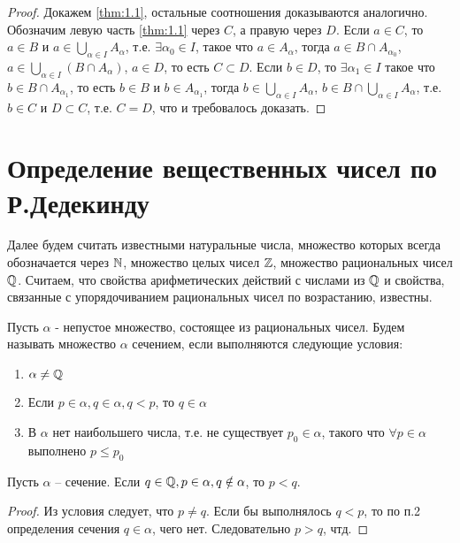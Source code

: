 \documentclass[main]{subfiles}
\begin{document}
\begin{proof}
    Докажем \eqref{thm:1.1}, остальные соотношения доказываются аналогично.
    Обозначим левую часть \eqref{thm:1.1} через $C$, а правую через $D$.
    Если $a \in C$, то $a\in B$ и $a \in \bigcup_{\alpha \in I} A_\alpha$,
    т.е. $\exists \alpha_0 \in I$, такое что $a \in A_\alpha$, тогда
    $a \in B \cap A_{\alpha_0}$, $a \in \bigcup_{\alpha \in I}(B \cap A_\alpha)$,
    $a \in D$, то есть $C \subset D$. Если $b \in D$, то $\exists \alpha_1 \in I$
    такое что $b \in B \cap A_{\alpha_1}$, то есть $b \in B$ и $b \in A_{\alpha_1}$,
    тогда $b \in \bigcup_{\alpha \in I} A_\alpha$,
    $b \in B \cap \bigcup_{\alpha \in I} A_\alpha$, т.е. $b \in C$ и $D \subset C$,
    т.е. $C = D$, что и требовалось доказать.
\end{proof}

\section{Определение вещественных чисел по Р.Дедекинду}
Далее будем считать известными натуральные числа, множество которых всегда
обозначается через $\mathbb{N}$, множество целых чисел $\mathbb{Z}$, множество
рациональных чисел $\mathbb{Q}$. Считаем, что свойства арифметических действий
с числами из $\mathbb{Q}$ и свойства, связанные с упорядочиванием рациональных
чисел по возрастанию, известны.

\begin{definition}
    Пусть $\alpha$ - непустое множество, состоящее из рациональных чисел. Будем
    называть множество $\alpha$ сечением, если выполняются следующие условия:
    \begin{enumerate}
        \item $\alpha \neq \mathbb{Q}$
        \item Если $p \in \alpha, q \in \alpha, q < p$, то $q \in \alpha$
        \item В $\alpha$ нет наибольшего числа, т.е. не существует $p_0 \in \alpha$,
              такого что $\forall p \in \alpha$ выполнено $p \leq p_0$
    \end{enumerate}
\end{definition}

\begin{assertion}
    Пусть $\alpha$ -- сечение. Если $q \in \mathbb{Q}, p \in \alpha, q \notin
        \alpha$, то $p < q$.
\end{assertion}
\begin{proof}
    Из условия следует, что $p \neq q$. Если бы выполнялось $q < p$, то по п.2
    определения сечения $q \in \alpha$, чего нет. Следовательно $p > q$, чтд.
\end{proof}
\end{document}
